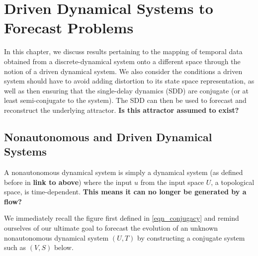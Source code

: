 \documentclass[12 pt]{article}
\begin{document}







\newpage

\section{Driven Dynamical Systems to Forecast Problems} \label{ch4}

In this chapter, we discuss results pertaining to the mapping of temporal data obtained from a discrete-dynamical system onto a different space through the notion of a driven dynamical system. 
We also consider the conditions a driven system should have to avoid adding distortion to its state space representation, as well as then ensuring that the single-delay dynamics (SDD) are conjugate (or at least semi-conjugate to the system). 
The SDD can then be used to forecast and reconstruct the underlying attractor. \textbf{Is this attractor assumed to exist?}

\subsection{Nonautonomous and Driven Dynamical Systems}

A nonautonomous dynamical system is simply a dynamical system (as defined before in \textbf{link to above}) where the input $u$ from the input space $U$, a  topological space, is time-dependent. \textbf{This means it can no longer be generated by a flow?}

We immediately recall the figure first defined in \ref{eqn_conjugacy} and remind ourselves of our ultimate goal to forecast the evolution of an unknown nonautonomous dynamical system $(U,T)$ by constructing a conjugate system such as $(V,S)$ below.
\end{document}
